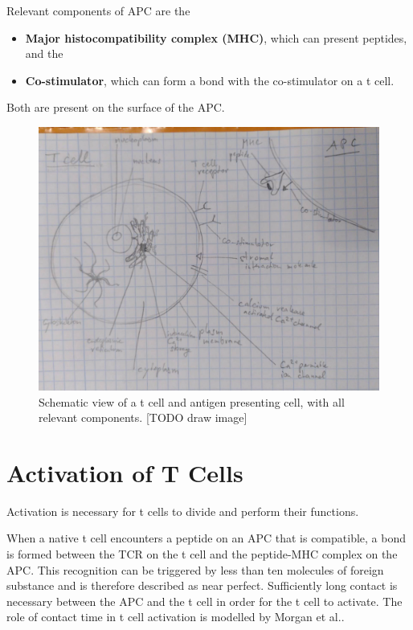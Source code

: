 Relevant components of APC are the
\begin{itemize}
	\item \textbf{Major histocompatibility complex (MHC)}, which can present peptides, and the
	\item \textbf{Co-stimulator}, which can form a bond with the co-stimulator on a t cell.
\end{itemize}

Both are present on the surface of the APC.

\begin{figure}
	\centering
	\includegraphics[width=\linewidth]{fig/tmp_t_cell_components}
	\caption{Schematic view of a t cell and antigen presenting cell, with all relevant components. [TODO draw image]}
	\label{fig:tcellcomponents}
\end{figure}

\section{Activation of T Cells}
\label{sec:t-cell/activation}

Activation is necessary for t cells to divide and perform their functions.\cite{Ganong1997}

When a native t cell encounters a peptide on an APC that is compatible, a bond is formed between the TCR on the t cell and the peptide-MHC complex on the APC. This recognition can be triggered by less than ten molecules of foreign substance and is therefore described as near perfect. Sufficiently long contact is necessary between the APC and the t cell in order for the t cell to activate. The role of contact time in t cell activation is modelled by Morgan et al.\cite{morgan2023}.

